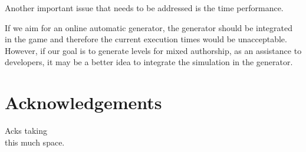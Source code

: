 \documentclass[runningheads,a4paper]{llncs}
\begin{document}




Another important issue that needs to be addressed is the time performance. 

If we aim for an online automatic generator, the generator should be 
integrated in the game and therefore the current execution times would
be unacceptable. However, if our goal is to 
generate levels for mixed authorship, as an assistance to developers, it may be 
a better idea to integrate the simulation in the generator.



\section*{Acknowledgements}
Acks taking\\
this much space.



\end{document}
